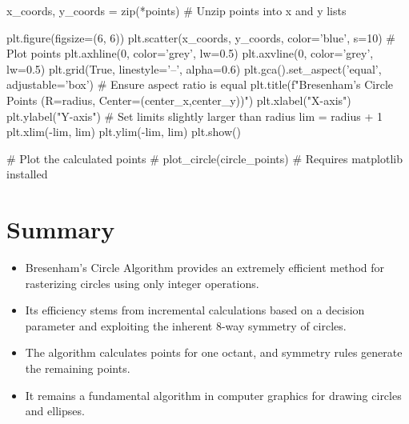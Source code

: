 \documentclass[12pt, a4paper]{article}
\begin{document}
\begin{pythoncode}
    x_coords, y_coords = zip(*points) # Unzip points into x and y lists

    plt.figure(figsize=(6, 6))
    plt.scatter(x_coords, y_coords, color='blue', s=10) # Plot points
    plt.axhline(0, color='grey', lw=0.5)
    plt.axvline(0, color='grey', lw=0.5)
    plt.grid(True, linestyle='--', alpha=0.6)
    plt.gca().set_aspect('equal', adjustable='box') # Ensure aspect ratio is equal
    plt.title(f"Bresenham's Circle Points (R={radius}, Center=({center_x},{center_y}))")
    plt.xlabel("X-axis")
    plt.ylabel("Y-axis")
    # Set limits slightly larger than radius
    lim = radius + 1
    plt.xlim(-lim, lim)
    plt.ylim(-lim, lim)
    plt.show()

# Plot the calculated points
# plot_circle(circle_points) # Requires matplotlib installed

\end{pythoncode}

\section{Summary}
\begin{tcolorbox}[
    colback=Green!10!white,
    colframe=ForestGreen!75!black,
    title=\faCheckCircle~ Key Takeaways,
    fonttitle=\bfseries\large
    ]
    \begin{itemize}
        \item Bresenham's Circle Algorithm provides an extremely efficient method for rasterizing circles using only integer operations.
        \item Its efficiency stems from incremental calculations based on a decision parameter and exploiting the inherent 8-way symmetry of circles.
        \item The algorithm calculates points for one octant, and symmetry rules generate the remaining points.
        \item It remains a fundamental algorithm in computer graphics for drawing circles and ellipses.
    \end{itemize}
\end{tcolorbox}
\end{document}
